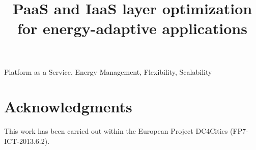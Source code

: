 \documentclass[10pt, conference, compsocconf]{IEEEtran}
\begin{document}
\title{PaaS and IaaS layer optimization for energy-adaptive applications}

\author{
}

\maketitle
\begin{abstract}

\end{abstract}

\begin{IEEEkeywords}
Platform as a Service, Energy Management, Flexibility, Scalability
\end{IEEEkeywords}








\section*{Acknowledgments}

This work has been carried out within the European Project DC4Cities (FP7-ICT-2013.6.2).



\end{document}
